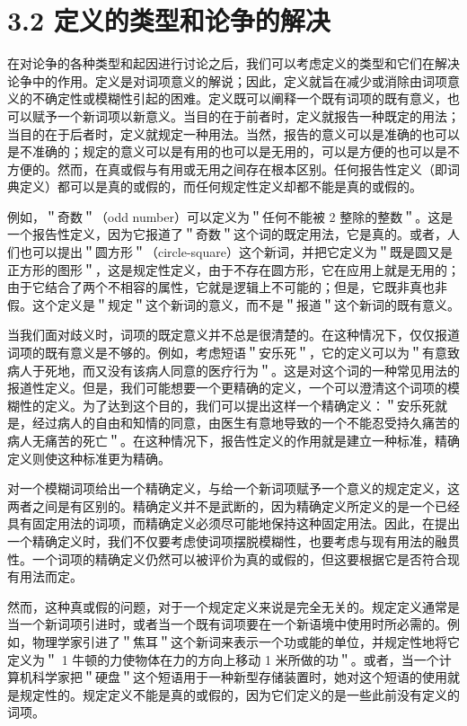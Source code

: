 \section*{3.2 定义的类型和论争的解决}
在对论争的各种类型和起因进行讨论之后，我们可以考虑定义的类型和它们在解决论争中的作用。定义是对词项意义的解说；因此，定义就旨在减少或消除由词项意义的不确定性或模糊性引起的困难。定义既可以阐释一个既有词项的既有意义，也可以赋予一个新词项以新意义。当目的在于前者时，定义就报告一种既定的用法；当目的在于后者时，定义就规定一种用法。当然，报告的意义可以是准确的也可以是不准确的；规定的意义可以是有用的也可以是无用的，可以是方便的也可以是不方便的。然而，在真或假与有用或无用之间存在根本区别。任何报告性定义（即词典定义）都可以是真的或假的，而任何规定性定义却都不能是真的或假的。

例如，＂奇数＂（odd number）可以定义为＂任何不能被 2 整除的整数＂。这是一个报告性定义，因为它报道了＂奇数＂这个词的既定用法，它是真的。或者，人们也可以提出＂圆方形＂（circle-square）这个新词，并把它定义为＂既是圆又是正方形的图形＂，这是规定性定义，由于不存在圆方形，它在应用上就是无用的；由于它结合了两个不相容的属性，它就是逻辑上不可能的；但是，它既非真也非假。这个定义是＂规定＂这个新词的意义，而不是＂报道＂这个新词的既有意义。

当我们面对歧义时，词项的既定意义并不总是很清楚的。在这种情况下，仅仅报道词项的既有意义是不够的。例如，考虑短语＂安乐死＂，它的定义可以为＂有意致病人于死地，而又没有该病人同意的医疗行为＂。这是对这个词的一种常见用法的报道性定义。但是，我们可能想要一个更精确的定义，一个可以澄清这个词项的模糊性的定义。为了达到这个目的，我们可以提出这样一个精确定义：＂安乐死就是，经过病人的自由和知情的同意，由医生有意地导致的一个不能忍受持久痛苦的病人无痛苦的死亡＂。在这种情况下，报告性定义的作用就是建立一种标准，精确定义则使这种标准更为精确。

对一个模糊词项给出一个精确定义，与给一个新词项赋予一个意义的规定定义，这两者之间是有区别的。精确定义并不是武断的，因为精确定义所定义的是一个已经具有固定用法的词项，而精确定义必须尽可能地保持这种固定用法。因此，在提出一个精确定义时，我们不仅要考虑使词项摆脱模糊性，也要考虑与现有用法的融贯性。一个词项的精确定义仍然可以被评价为真的或假的，但这要根据它是否符合现有用法而定。

然而，这种真或假的问题，对于一个规定定义来说是完全无关的。规定定义通常是当一个新词项引进时，或者当一个既有词项要在一个新语境中使用时所必需的。例如，物理学家引进了＂焦耳＂这个新词来表示一个功或能的单位，并规定性地将它定义为＂ 1 牛顿的力使物体在力的方向上移动 1 米所做的功＂。或者，当一个计算机科学家把＂硬盘＂这个短语用于一种新型存储装置时，她对这个短语的使用就是规定性的。规定定义不能是真的或假的，因为它们定义的是一些此前没有定义的词项。

